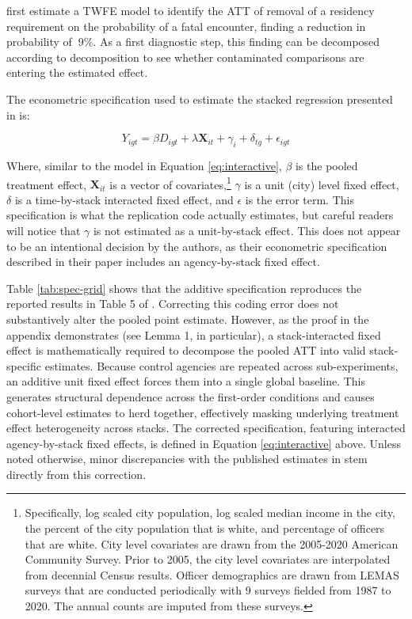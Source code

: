 \documentclass[12pt]{article}
\begin{document}
\textcite{payson2025residency} first estimate a TWFE model to identify the ATT of removal of a residency requirement on the probability of a fatal encounter, finding a reduction in probability of $~9\%$. As a first diagnostic step, this finding can be decomposed according to \textcite{goodman2021difference} decomposition to see whether contaminated comparisons are entering the estimated effect.

The econometric specification used to estimate the stacked regression presented in \textcite{payson2025residency} is:

\begin{equation}\label{eq:add_model}
    Y_{igt} = \beta D_{igt} + \lambda \mathbf{X}_{it} + \gamma_{i} + \delta_{tg} + \epsilon_{igt}
\end{equation}

Where, similar to the model in Equation \ref{eq:interactive}, $\beta$ is the pooled treatment effect, $\mathbf{X}_{it}$ is a vector of covariates,\footnote{Specifically, log scaled city population, log scaled median income in the city, the percent of the city population that is white, and percentage of officers that are white. City level covariates are drawn from the 2005-2020 American Community Survey. Prior to 2005, the city level covariates are interpolated from decennial Census results. Officer demographics are drawn from LEMAS surveys that are conducted periodically with 9 surveys fielded from 1987 to 2020. The annual counts are imputed from these surveys.} $\gamma$ is a unit (city) level fixed effect, $\delta$ is a time-by-stack interacted fixed effect, and $\epsilon$ is the error term. This specification is what the replication code actually estimates, but careful readers will notice that $\gamma$ is not estimated as a unit-by-stack effect. This does not appear to be an intentional decision by the authors, as their econometric specification described in their paper includes an agency-by-stack fixed effect. 

Table \ref{tab:spec-grid} shows that the additive specification reproduces the reported results in Table 5 of \textcite{payson2025residency}. Correcting this coding error does not substantively alter the pooled point estimate. However, as the proof in the appendix demonstrates (see Lemma 1, in particular), a stack-interacted fixed effect is mathematically required to decompose the pooled ATT into valid stack-specific estimates. Because control agencies are repeated across sub-experiments, an additive unit fixed effect forces them into a single global baseline. This generates structural dependence across the first-order conditions and causes cohort-level estimates to herd together, effectively masking underlying treatment effect heterogeneity across stacks. The corrected specification, featuring interacted agency-by-stack fixed effects, is defined in Equation \ref{eq:interactive} above. Unless noted otherwise, minor discrepancies with the published estimates in \textcite{payson2025residency} stem directly from this correction.
\end{document}
